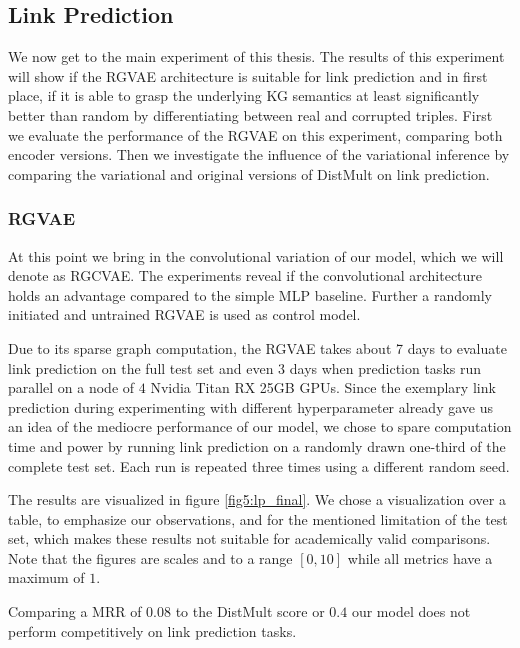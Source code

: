 \subsection{Link Prediction}


 We now get to the main experiment of this thesis. The results of this experiment will show if the RGVAE architecture is suitable for link prediction and in first place, if it is able to grasp the underlying KG semantics at least significantly better than random by differentiating between real and corrupted triples. First we evaluate the performance of the RGVAE on this experiment, comparing both encoder versions. Then we investigate the influence of the variational inference by comparing the variational and original versions of DistMult on link prediction.
 
 \subsubsection{RGVAE}

 At this point we bring in the convolutional variation of our model, which we will denote as RGCVAE. The experiments reveal if the convolutional architecture holds an advantage compared to the simple MLP baseline. Further a randomly initiated and untrained RGVAE is used as control model.
 
 Due to its sparse graph computation, the RGVAE takes about 7 days to evaluate link prediction on the full test set and even 3 days when prediction tasks run parallel on a node of $4$ Nvidia Titan RX 25GB GPUs. Since the exemplary link prediction during experimenting with different hyperparameter already gave us an idea of the mediocre performance of our model, we chose to spare computation time and power by running link prediction on a randomly drawn one-third of the complete test set. Each run is repeated three times using a different random seed.

The results are visualized in figure \ref{fig5:lp_final}. We chose a visualization over a table, to emphasize our observations, and for the mentioned limitation of the test set, which makes these results not suitable for academically valid comparisons. Note that the figures are scales and to a range $[0,10]$ while all metrics have a maximum of $1$.

Comparing a MRR of $0.08$ to the DistMult score or $0.4$ our model does not perform competitively on link prediction tasks.


